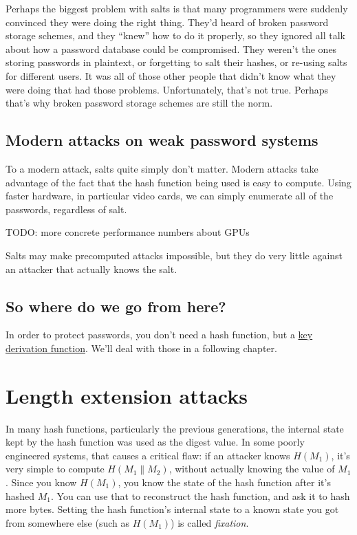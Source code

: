 \documentclass[11pt,ebook,table,dvipsnames]{memoir}
\begin{document}
Perhaps the biggest problem with salts is that many programmers were
suddenly convinced they were doing the right thing. They'd heard of
broken password storage schemes, and they \enquote{knew} how to do it
properly, so they ignored all talk about how a password database could
be compromised. They weren't the ones storing passwords in plaintext,
or forgetting to salt their hashes, or re-using salts for different
users. It was all of those other people that didn't know what they
were doing that had those problems. Unfortunately, that's not true.
Perhaps that's why broken password storage schemes are still the norm.
\subsection{Modern attacks on weak password systems}
\label{sec-2-6-7-4}

To a modern attack, salts quite simply don't matter. Modern attacks
take advantage of the fact that the hash function being used is easy
to compute. Using faster hardware, in particular video cards, we can
simply enumerate all of the passwords, regardless of salt.

TODO: more concrete performance numbers about GPUs

Salts may make precomputed attacks impossible, but they do very little
against an attacker that actually knows the salt.
\subsection{So where do we go from here?}
\label{sec-2-6-7-5}

In order to protect passwords, you don't need a hash function, but a
\hyperref[key-derivation-function]{key derivation function}. We'll deal with those in a following chapter.
\section{Length extension attacks}
\label{sec-2-6-8}

In many hash functions, particularly the previous generations, the
internal state kept by the hash function was used as the digest value.
In some poorly engineered systems, that causes a critical flaw: if an
attacker knows $H(M_1)$, it's very simple to compute $H(M_1 \| M_2)$,
without actually knowing the value of $M_1$. Since you know $H(M_1)$,
you know the state of the hash function after it's hashed $M_1$. You
can use that to reconstruct the hash function, and ask it to hash more
bytes. Setting the hash function's internal state to a known state
you got from somewhere else (such as $H(M_1)$) is called \emph{fixation}.
\end{document}
